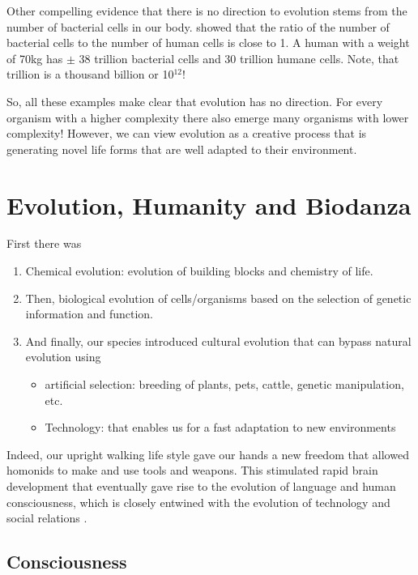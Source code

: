 \documentclass[
  11pt,
]{book}
\providecommand{\tightlist}{%
  \setlength{\itemsep}{0pt}\setlength{\parskip}{0pt}}
\begin{document}
Other compelling evidence that there is no direction to evolution stems from the number of bacterial cells in our body. \citet{Sender2016} showed that the ratio of the number of bacterial cells to the number of human cells is close to 1. A human with a weight of 70kg has \(\pm\) 38 trillion bacterial cells and 30 trillion humane cells. Note, that trillion is a thousand billion or 10\(^{12}\)!

So, all these examples make clear that evolution has no direction. For every organism with a higher complexity there also emerge many organisms with lower complexity! However, we can view evolution as a creative process that is generating novel life forms that are well adapted to their environment.

\hypertarget{evolution-humanity-and-biodanza}{%
\section{Evolution, Humanity and Biodanza}\label{evolution-humanity-and-biodanza}}

First there was

\begin{enumerate}
\def\labelenumi{\arabic{enumi}.}
\item
  Chemical evolution: evolution of building blocks and chemistry of life.
\item
  Then, biological evolution of cells/organisms based on the selection of genetic information and function.
\item
  And finally, our species introduced cultural evolution that can bypass natural evolution using

  \begin{itemize}
  \tightlist
  \item
    artificial selection: breeding of plants, pets, cattle, genetic manipulation, etc.
  \item
    Technology: that enables us for a fast adaptation to new environments
  \end{itemize}
\end{enumerate}

Indeed, our upright walking life style gave our hands a new freedom that allowed homonids to make and use tools and weapons. This stimulated rapid brain development that eventually gave rise to the evolution of language and human consciousness, which is closely entwined with the evolution of technology and social relations \citep{capraLuisi2014}.

\hypertarget{consciousness}{%
\subsection{Consciousness}\label{consciousness}}
\end{document}
